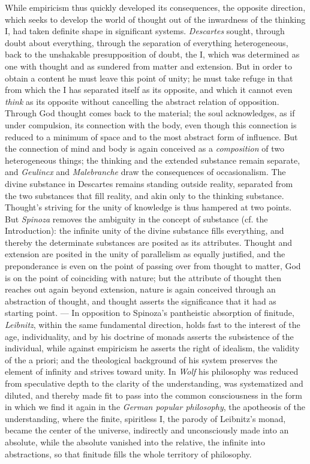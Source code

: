 \documentclass[12pt,a4paper,openany]{book}
\newcommand{\opage}[1]{\marginnote{\footnotesize\textit{[#1]}}}
\begin{document}
While empiricism thus quickly developed its consequences, the opposite
direction, which seeks to develop the world of thought out of the
inwardness of the thinking I, had taken definite shape in significant
systems. \emph{Descartes} sought, through doubt about everything, through
the separation of everything heterogeneous, back to the unshakable
presupposition of doubt, the I, which was determined as one with thought
and as sundered from matter and extension. But in order to obtain a
content he must leave this point of unity; he must take refuge in that
from which the I has separated itself as its opposite, and which it
cannot even \emph{think} as its opposite without cancelling the abstract
relation of opposition. Through God thought comes back to the material;
the soul acknowledges, as if under compulsion, its connection with the
body, even though this connection is reduced to a minimum of space and to
the most abstract form of influence. But the connection of mind and body
is again conceived as a \emph{composition} of two heterogeneous things;
the thinking and the extended substance remain separate, and
\emph{Geulincx} and \emph{Malebranche} draw the consequences of
occasionalism. The divine substance in Descartes remains standing outside
reality, separated from the two substances that fill reality, and akin
only to the thinking substance. Thought's striving for the unity of
knowledge is thus hampered at two points. But \emph{Spinoza} removes the
ambiguity in the concept of substance (cf. the Introduction): the
infinite unity of the divine substance fills everything, and thereby the
determinate substances are posited as its attributes. Thought and
extension are posited in the unity of parallelism as equally justified,
and the preponderance is even on the point of passing over from thought
to matter, God is on the point of coinciding with nature; but the
attribute of thought then reaches out again beyond extension, nature is
again conceived through an
\opage{9}abstraction of thought, and thought asserts the significance that
it had as starting point. --- In opposition to Spinoza's pantheistic
absorption of finitude, \emph{Leibnitz}, within the same fundamental
direction, holds fast to the interest of the age, individuality, and by
his doctrine of monads asserts the subsistence of the individual, while
against empiricism he asserts the right of idealism, the validity of the
a priori; and the theological background of his system preserves the
element of infinity and strives toward unity. In \emph{Wolf} his
philosophy was reduced from speculative depth to the clarity of the
understanding, was systematized and diluted, and thereby made fit to
pass into the common consciousness in the form in which we find it again
in the \emph{German popular philosophy}, the apotheosis of the
understanding, where the finite, spiritless I, the parody of Leibnitz's
monad, became the center of the universe, indirectly and unconsciously
made into an absolute, while the absolute vanished into the relative, the
infinite into abstractions, so that finitude fills the whole territory
of philosophy.
\end{document}
